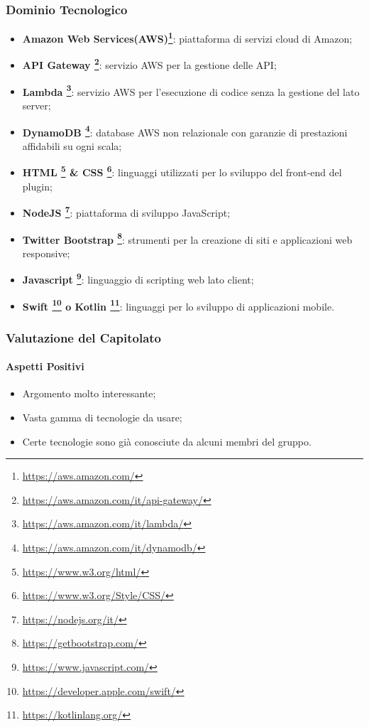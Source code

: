 \subsubsection{Dominio Tecnologico}
\begin{itemize}
	\item \textbf{Amazon Web Services(AWS)\footnote{\hyperref[Link al sito]{https://aws.amazon.com/}}}: piattaforma di servizi cloud di Amazon;
	\item \textbf{API Gateway \footnote{\hyperref[Link al sito]{https://aws.amazon.com/it/api-gateway/}}}: servizio AWS per la gestione delle API;
	\item \textbf{Lambda \footnote{\hyperref[Link al sito]{https://aws.amazon.com/it/lambda/}}}: servizio AWS per l’esecuzione di codice senza la gestione del lato server;
	\item \textbf{DynamoDB \footnote{\hyperref[Link al sito]{https://aws.amazon.com/it/dynamodb/}}}: database AWS non relazionale con garanzie di prestazioni affidabili su ogni scala;
	\item \textbf{HTML \footnote{\hyperref[Link al sito]{https://www.w3.org/html/}} \& CSS \footnote{\hyperref[Link al sito]{https://www.w3.org/Style/CSS/}}}: linguaggi utilizzati per lo sviluppo del front-end del plugin;
	\item \textbf{NodeJS \footnote{\hyperref[Link al sito]{https://nodejs.org/it/}}}: piattaforma di sviluppo JavaScript;
	\item \textbf{Twitter Bootstrap \footnote{\hyperref[Link al sito]{https://getbootstrap.com/}}}: strumenti per la creazione di siti e applicazioni web responsive;
	\item \textbf{Javascript \footnote{\hyperref[Link al sito]{https://www.javascript.com/}}}: linguaggio di scripting web lato client;
	\item \textbf{Swift \footnote{\hyperref[Link al sito]{https://developer.apple.com/swift/}} o Kotlin \footnote{\hyperref[Link al sito]{https://kotlinlang.org/}}}: linguaggi per lo sviluppo di applicazioni mobile.
\end{itemize}

\subsubsection{Valutazione del Capitolato}
\paragraph{Aspetti Positivi}
\begin{itemize}
	\item Argomento molto interessante;
	\item Vasta gamma di tecnologie da usare;
	\item Certe tecnologie sono già conosciute da alcuni membri del gruppo.
\end{itemize}

